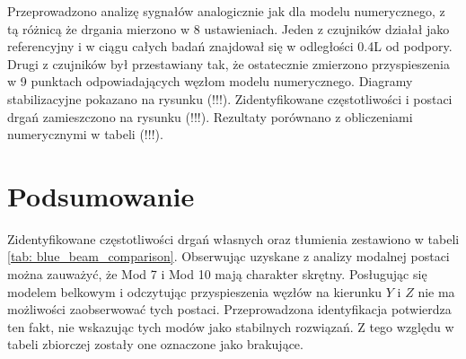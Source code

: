 Przeprowadzono analizę sygnałów analogicznie jak dla modelu numerycznego, z tą różnicą że drgania mierzono w 8 ustawieniach. Jeden z czujników działał jako referencyjny i w ciągu całych badań znajdował się w odległości 0.4L od podpory. Drugi z czujników był przestawiany tak, że ostatecznie zmierzono przyspieszenia w 9 punktach odpowiadających węzłom modelu numerycznego. Diagramy stabilizacyjne pokazano na rysunku (!!!). Zidentyfikowane częstotliwości i postaci drgań zamieszczono na rysunku (!!!). Rezultaty porównano z obliczeniami numerycznymi w tabeli (!!!).





\section{Podsumowanie}
Zidentyfikowane częstotliwości drgań własnych oraz tłumienia zestawiono w tabeli \ref{tab: blue_beam_comparison}. Obserwując uzyskane z analizy modalnej postaci można zauważyć, że Mod 7 i Mod 10 mają charakter skrętny. Posługując się modelem belkowym i odczytując przyspieszenia węzłów na kierunku $Y$ i $Z$ nie ma możliwości zaobserwować tych postaci. Przeprowadzona identyfikacja potwierdza ten fakt, nie wskazując tych modów jako stabilnych rozwiązań. Z tego względu w tabeli zbiorczej zostały one oznaczone jako brakujące.






